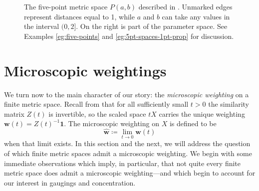 \documentclass[a4paper, oneside, reqno]{amsart}
\theoremstyle{definition}
\theoremstyle{remark}
\numberwithin{equation}{section}
\renewcommand{\vec}{\mathbf}
\newcommand{\onevector}{\mathbf{1}}
\newcommand{\micro}{\widehat{\vec{w}}}
\begin{document}
\begin{figure}
    \caption{The five-point metric space \(P(a,b)\) described in . Unmarked edges represent distances equal to 1, while \(a\) and \(b\) can take any values in the interval \((0,2]\). On the right is part of the parameter space. See Examples \ref{eg:five-points} and \ref{eg:5pt-spaces-1pt-prop} for discussion.
    }
    \label{fig:graph-family}
\end{figure}


\section{Microscopic weightings}
\label{sec:microscopic_weightings}

We turn now to the main character of our story: the \emph{microscopic weighting} on a finite metric space. Recall from  that for all sufficiently small \(t > 0\) the similarity matrix \(Z(t)\) is invertible, so the scaled space \(tX\) carries the unique weighting \(\vec{w}(t) = Z(t)^{-1} \onevector\). The microscopic weighting on \(X\) is defined to be
\[\micro \coloneq \lim_{t \to 0} \vec{w}(t)\]
when that limit exists. In this section and the next, we will address the question of which finite metric spaces admit a microscopic weighting. We begin with some immediate observations which imply, in particular, that not quite every finite metric space does admit a microscopic weighting---and which begin to account for our interest in gaugings and concentration.
\end{document}
